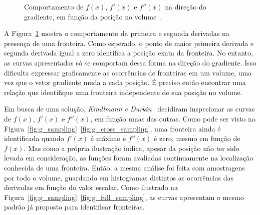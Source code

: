 \begin{figure}[h]
	\centering
	\caption{Comportamento de $f(x)$, $f'(x)$ e $f''(x)$ na direção do gradiente, em função da posição no volume~\cite{gordon}.}
	\label{fig:g_functions}
\end{figure}
	
	A Figura~\ref{fig:g_functions} mostra o comportamento da primeira e segunda derivadas na presença de uma fronteira. Como esperado, o ponto de maior primeira derivada e segunda derivada igual a zero identifica a posição exata da fronteira. No entanto, as curvas apresentadas só se comportam dessa forma na direção do gradiente. Isso dificulta expressar graficamente as ocorrências de fronteiras em um volume, uma vez que o vetor gradiente muda a cada posição. É preciso então encontrar uma relação que identifique uma fronteira independente de sua posição no volume.
	
	Em busca de uma solução, \textit{Kindlmann e Durkin}~\cite{gordon} decidiram inspecionar as curvas de $ f(x) $, $ f'(x) $ e $ f''(x) $, em função umas das outras. Como pode ser visto na Figura~\ref{fig:g_sampling}~\ref{fig:g_cross_sampling}, uma fronteira ainda é identificada quando $ f'(x) $ é máximo e $ f''(x) $ é zero, mesmo em função de $ f(x) $. Mas como a própria ilustração indica, apesar da posição não ter sido levada em consideração, as funções foram avaliadas continuamente na localização conhecida de uma fronteira. Então, a mesma análise foi feita com amostragens por todo o volume, guardando em histogramas distintos as ocorrências das derivadas em função do valor escalar. Como ilustrado na Figura~\ref{fig:g_sampling}~\ref{fig:g_full_sampling}, as curvas apresentam o mesmo padrão já proposto para identificar fronteiras.
	
